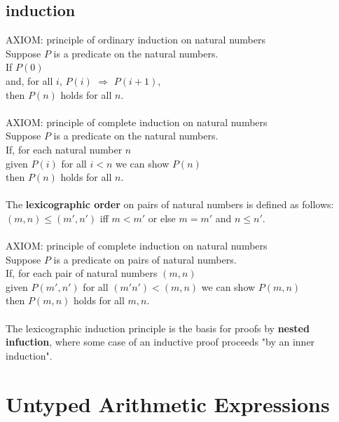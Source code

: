 \documentclass{article}
\begin{document}
\subsection{induction}
AXIOM: principle of ordinary induction on natural numbers\\
Suppose \(P\) is a predicate on the natural numbers.\\
\null\qquad If \(P(0)\)\\
\null\qquad and, for all \(i\), \(P(i)\) \(\Longrightarrow\) \(P(i+1)\),\\
\null\qquad then \(P(n)\) holds for all \(n\).\\\\
AXIOM: principle of complete induction on natural numbers\\
Suppose \(P\) is a predicate on the natural numbers.\\
\null\qquad If, for each natural number \(n\)\\
\null\qquad given \(P(i)\) for all \(i < n\) we can show \(P(n)\)\\
\null\qquad then \(P(n)\) holds for all \(n\).\\\\
The \textbf{lexicographic order} on pairs of natural numbers is defined as follows: \((m,n)\le(m',n')\) iff \(m<m'\) or else \(m=m'\) and \(n\le n'\).\\\\
AXIOM: principle of complete induction on natural numbers\\
Suppose \(P\) is a predicate on pairs of natural numbers.\\
\null\qquad If, for each pair of natural numbers \((m,n)\)\\
\null\qquad given \(P(m',n')\) for all \((m'n')<(m,n)\) we can show \(P(m,n)\)\\
\null\qquad then \(P(m,n)\) holds for all \(m,n\).\\\\
The lexicographic induction principle is the basis for proofs by \textbf{nested infuction}, where some case of an inductive proof proceeds "by an inner induction".
\section{Untyped Arithmetic Expressions}
\end{document}
